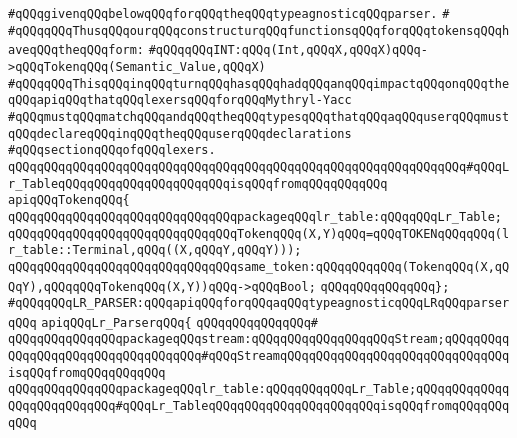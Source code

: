 \verb|#qQQqgivenqQQqbelowqQQqforqQQqtheqQQqtypeagnosticqQQqparser.|\newline
\verb|#|\newline
\verb|#qQQqqQQqThusqQQqourqQQqconstructurqQQqfunctionsqQQqforqQQqtokensqQQqhaveqQQqtheqQQqform:|\newline
\verb|#qQQqqQQqINT:qQQq(Int,qQQqX,qQQqX)qQQq->qQQqTokenqQQq(Semantic_Value,qQQqX)|\newline
\verb|#qQQqqQQqThisqQQqinqQQqturnqQQqhasqQQqhadqQQqanqQQqimpactqQQqonqQQqtheqQQqapiqQQqthatqQQqlexersqQQqforqQQqMythryl-Yacc|\newline
\verb|#qQQqmustqQQqmatchqQQqandqQQqtheqQQqtypesqQQqthatqQQqaqQQquserqQQqmustqQQqdeclareqQQqinqQQqtheqQQquserqQQqdeclarations|\newline
\verb|#qQQqsectionqQQqofqQQqlexers.|\newline
\newline
\verb|qQQqqQQqqQQqqQQqqQQqqQQqqQQqqQQqqQQqqQQqqQQqqQQqqQQqqQQqqQQqqQQq#qQQqLr_TableqQQqqQQqqQQqqQQqqQQqqQQqisqQQqfromqQQqqQQqqQQq|\newline
\verb|apiqQQqTokenqQQq{|\newline
\newline
\verb|qQQqqQQqqQQqqQQqqQQqqQQqqQQqqQQqpackageqQQqlr_table:qQQqqQQqLr_Table;|\newline
\verb|qQQqqQQqqQQqqQQqqQQqqQQqqQQqqQQqTokenqQQq(X,Y)qQQq=qQQqTOKENqQQqqQQq(lr_table::Terminal,qQQq((X,qQQqY,qQQqY)));|\newline
\verb|qQQqqQQqqQQqqQQqqQQqqQQqqQQqqQQqsame_token:qQQqqQQqqQQq(TokenqQQq(X,qQQqY),qQQqqQQqTokenqQQq(X,Y))qQQq->qQQqBool;|\newline
\verb|qQQqqQQqqQQqqQQq};|\newline
\newline
\verb|#qQQqqQQqLR_PARSER:qQQqapiqQQqforqQQqaqQQqtypeagnosticqQQqLRqQQqparserqQQq|\newline
\newline
\verb|apiqQQqLr_ParserqQQq{|\newline
\verb|qQQqqQQqqQQqqQQq#|\newline
\verb|qQQqqQQqqQQqqQQqpackageqQQqstream:qQQqqQQqqQQqqQQqqQQqStream;qQQqqQQqqQQqqQQqqQQqqQQqqQQqqQQqqQQq#qQQqStreamqQQqqQQqqQQqqQQqqQQqqQQqqQQqqQQqisqQQqfromqQQqqQQqqQQq|\newline
\verb|qQQqqQQqqQQqqQQqpackageqQQqlr_table:qQQqqQQqqQQqLr_Table;qQQqqQQqqQQqqQQqqQQqqQQqqQQq#qQQqLr_TableqQQqqQQqqQQqqQQqqQQqqQQqisqQQqfromqQQqqQQqqQQq|\newline
